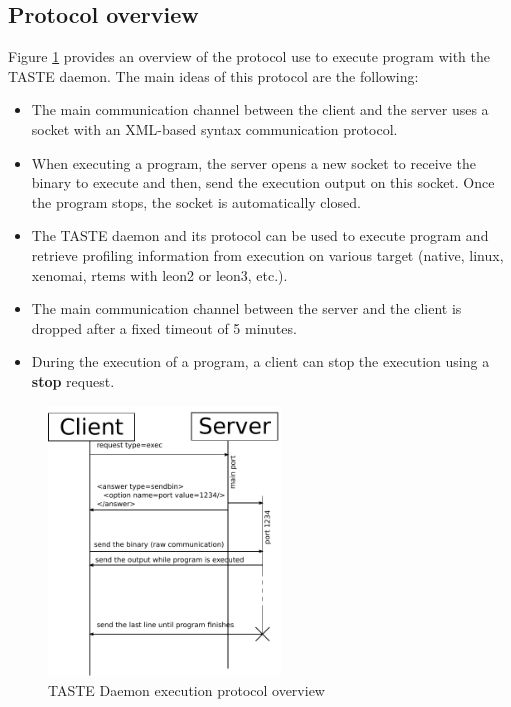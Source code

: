 \documentclass[11pt]{book}
\begin{document}
      \subsection{Protocol overview}
      Figure \ref{tasted-exec-protocol} provides an overview of the protocol use
      to execute program with the TASTE daemon. The main ideas of this protocol
      are the following:
      \begin{itemize}
         \item
            The main communication channel between the client and the server
            uses a socket with an XML-based syntax communication protocol.
         \item
            When executing a program, the server opens a new socket to receive
            the binary to execute and then, send the execution output on this
            socket. Once the program stops, the socket is automatically closed.
         \item
            The TASTE daemon and its protocol can be used to execute program and
            retrieve profiling information from execution on various target
            (native, linux, xenomai, rtems with leon2 or leon3, etc.).
         \item
            The main communication channel between the server and the client
            is dropped after a fixed timeout of 5 minutes.
         \item
            During the execution of a program, a client can stop the execution
            using a \textbf{stop} request.
      \end{itemize}

\begin{figure}[!h]
\centering
\includegraphics[width=0.55\textwidth]{imgs/tasted-exec-protocol}
\caption{TASTE Daemon execution protocol overview}
\label{tasted-exec-protocol}
\end{figure}
\end{document}
